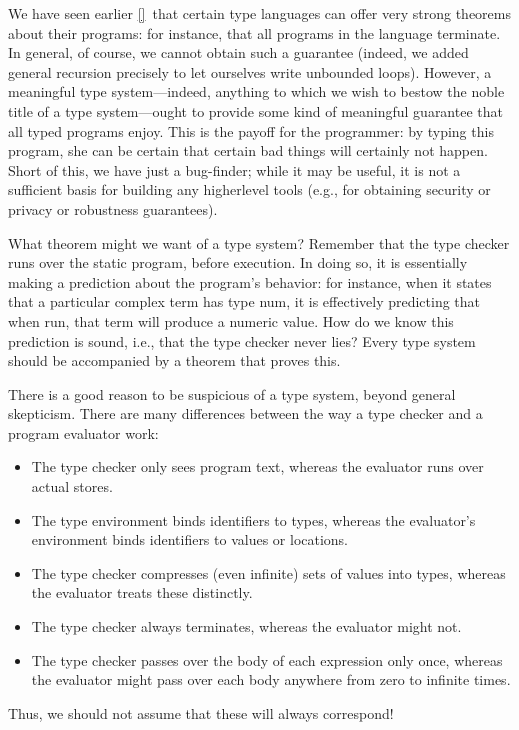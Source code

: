 
We have seen earlier \ref{}\ that certain type languages can offer very strong
theorems about their programs: for instance, that all programs in the language
terminate. In general, of course, we cannot obtain such a guarantee (indeed, we
added general recursion precisely to let ourselves write unbounded loops).
However, a meaningful type system—indeed, anything to which we wish to bestow
the noble title of a type system—ought to provide some kind of meaningful
guarantee that all typed programs enjoy. This is the payoff for the programmer:
by typing this program, she can be certain that certain bad things will
certainly not happen. Short of this, we have just a bug-finder; while it may be
useful, it is not a sufficient basis for building any higherlevel tools (e.g.,
for obtaining security or privacy or robustness guarantees).

What theorem might we want of a type system? Remember that the type checker runs
over the static program, before execution. In doing so, it is essentially making
a prediction about the program’s behavior: for instance, when it states that a
particular complex term has type num, it is effectively predicting that when
run, that term will produce a numeric value. How do we know this prediction is
sound, i.e., that the type checker never lies? Every type system should be
accompanied by a theorem that proves this.

There is a good reason to be suspicious of a type system, beyond general
skepticism. There are many differences between the way a type checker and a
program evaluator work:
\begin{itemize}[nosep]
  \item 
The type checker only sees program text, whereas the evaluator runs over actual
stores.
  \item 
The type environment binds identifiers to types, whereas the evaluator’s
environment binds identifiers to values or locations.
  \item 
The type checker compresses (even infinite) sets of values into types, whereas
the evaluator treats these distinctly.
  \item 
The type checker always terminates, whereas the evaluator might not.
  \item 
The type checker passes over the body of each expression only once, whereas the
evaluator might pass over each body anywhere from zero to infinite times.
\end{itemize}
Thus, we should not assume that these will always correspond!

